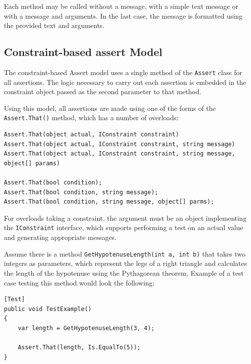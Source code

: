 \documentclass[
  print,
  table,
  nolof,
  nolot,
  nocover,
  oneside
]{fithesis3}
\begin{document}
Each method may be called without a message, with a simple text message or with a message and arguments. In the last case, the message is formatted using the provided text and arguments.

\subsection{Constraint-based assert Model}
\label{constraint model}

The constraint-based Assert model uses a single method of the \texttt{Assert} class for all assertions. The logic necessary to carry out each assertion is embedded in the constraint object passed as the second parameter to that method.

Using this model, all assertions are made using one of the forms of the \texttt{Assert.That()} method, which has a number of overloads:
\begin{lstlisting}
Assert.That(object actual, IConstraint constraint)
Assert.That(object actual, IConstraint constraint, string message)
Assert.That(object actual, IConstraint constraint, string message, object[] params)

Assert.That(bool condition);
Assert.That(bool condition, string message);
Assert.That(bool condition, string message, object[] parms);
\end{lstlisting}

For overloads taking a constraint, the argument must be an object implementing the \texttt{IConstraint} interface, which supports performing a test on an actual value and generating appropriate messages\parencite{nunit_model}.

Assume there is a method \texttt{GetHypotenuseLength(int a, int b)} that takes two integers as parameters, which represent the legs of a right triangle and calculates the length of the hypotenuse using the Pythagorean theorem. Example of a test case testing this method would look the following:
\begin{lstlisting}
[Test]
public void TestExample()
{
    var length = GetHypotenuseLength(3, 4);
    
    Assert.That(length, Is.EqualTo(5));
}
\end{lstlisting}



\end{document}
